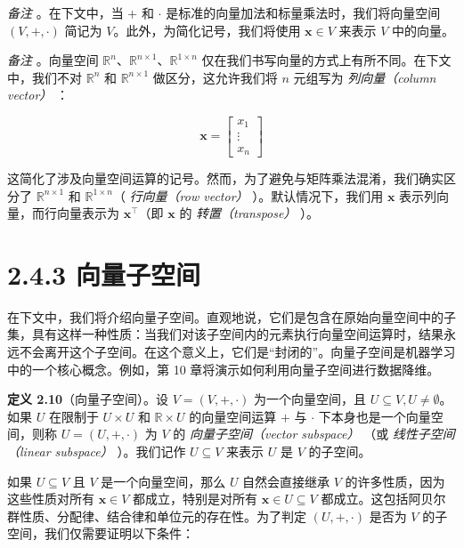 \emph{备注} 。在下文中，当 $ + $ 和 $ \cdot $ 是标准的向量加法和标量乘法时，我们将向量空间 $ (V, +, \cdot) $ 简记为 $ V $。此外，为简化记号，我们将使用 $ \boldsymbol{x} \in V $ 来表示 $ V $ 中的向量。

\emph{备注} 。向量空间 $ \mathbb{R}^n $、$ \mathbb{R}^{n \times 1} $、$ \mathbb{R}^{1 \times n} $ 仅在我们书写向量的方式上有所不同。在下文中，我们不对 $ \mathbb{R}^n $ 和 $ \mathbb{R}^{n \times 1} $ 做区分，这允许我们将 $ n $ 元组写为 \emph{列向量（column vector）} ：

\begin{equation}
\boldsymbol{x} = \begin{bmatrix} x_1 \\ \vdots \\ x_n \end{bmatrix}
\tag{2.64}\label{eq:2-64}
\end{equation}

这简化了涉及向量空间运算的记号。然而，为了避免与矩阵乘法混淆，我们确实区分了 $ \mathbb{R}^{n \times 1} $ 和 $ \mathbb{R}^{1 \times n} $（ \emph{行向量（row vector）} ）。默认情况下，我们用 $ \boldsymbol{x} $ 表示列向量，而行向量表示为 $ \boldsymbol{x}^\top $（即 $ \boldsymbol{x} $ 的 \emph{转置（transpose）} ）。

\section*{2.4.3 向量子空间}

在下文中，我们将介绍向量子空间。直观地说，它们是包含在原始向量空间中的子集，具有这样一种性质：当我们对该子空间内的元素执行向量空间运算时，结果永远不会离开这个子空间。在这个意义上，它们是“封闭的”。向量子空间是机器学习中的一个核心概念。例如，第 10 章将演示如何利用向量子空间进行数据降维。

\textbf{定义 2.10}（向量子空间）。设 $ V = (V, +, \cdot) $ 为一个向量空间，且 $ U \subseteq V, U \neq \emptyset $。如果 $ U $ 在限制于 $ U \times U $ 和 $ \mathbb{R} \times U $ 的向量空间运算 $ + $ 与 $ \cdot $ 下本身也是一个向量空间，则称 $ U = (U, +, \cdot) $ 为 $ V $ 的 \emph{向量子空间（vector subspace）} （或 \emph{线性子空间（linear subspace）} ）。我们记作 $ U \subseteq V $ 来表示 $ U $ 是 $ V $ 的子空间。

如果 $ U \subseteq V $ 且 $ V $ 是一个向量空间，那么 $ U $ 自然会直接继承 $ V $ 的许多性质，因为这些性质对所有 $ \boldsymbol{x} \in V $ 都成立，特别是对所有 $ \boldsymbol{x} \in U \subseteq V $ 都成立。这包括阿贝尔群性质、分配律、结合律和单位元的存在性。为了判定 $ (U, +, \cdot) $ 是否为 $ V $ 的子空间，我们仅需要证明以下条件：

